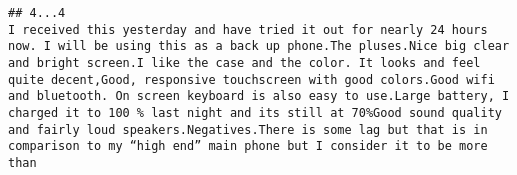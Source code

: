 \documentclass[
  11pt,
]{article}
\begin{document}
\begin{verbatim}
## 4...4                                                                                                                                                                                                                                                                                                                                                                                                                                                                                                                                                                                                                                                                                                                                                                                                                                                                                                                                                                                                                                                                                                                                                                                                                                                                                                                                                                                                                                                                                                                                                                                                                                                                                                                                                                                                                                                                                                                                                                                                                                                                                                                                                                                                                                                                                                                                                                                                                                                                                                                                                                                                                                                                                                                                                                                                                                                            I received this yesterday and have tried it out for nearly 24 hours now. I will be using this as a back up phone.The pluses.Nice big clear and bright screen.I like the case and the color. It looks and feel quite decent,Good, responsive touchscreen with good colors.Good wifi and bluetooth. On screen keyboard is also easy to use.Large battery, I charged it to 100 % last night and its still at 70%Good sound quality and fairly loud speakers.Negatives.There is some lag but that is in comparison to my “high end” main phone but I consider it to be more than 
\end{verbatim}
\end{document}
